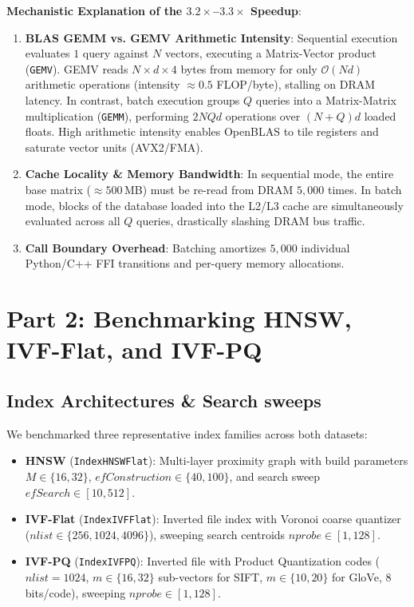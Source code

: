 \documentclass[10pt,twocolumn,a4paper]{article}
\begin{document}
\noindent\textbf{Mechanistic Explanation of the $3.2\times$--$3.3\times$ Speedup}:
\begin{enumerate}
    \item \textbf{BLAS GEMM vs. GEMV Arithmetic Intensity}: Sequential execution evaluates $1$ query against $N$ vectors, executing a Matrix-Vector product (\texttt{GEMV}). GEMV reads $N \times d \times 4$ bytes from memory for only $\mathcal{O}(N d)$ arithmetic operations (intensity $\approx 0.5$ FLOP/byte), stalling on DRAM latency. In contrast, batch execution groups $Q$ queries into a Matrix-Matrix multiplication (\texttt{GEMM}), performing $2 N Q d$ operations over $(N + Q) d$ loaded floats. High arithmetic intensity enables OpenBLAS to tile registers and saturate vector units (AVX2/FMA).
    \item \textbf{Cache Locality \& Memory Bandwidth}: In sequential mode, the entire base matrix ($\approx 500$\,MB) must be re-read from DRAM $5,000$ times. In batch mode, blocks of the database loaded into the L2/L3 cache are simultaneously evaluated across all $Q$ queries, drastically slashing DRAM bus traffic.
    \item \textbf{Call Boundary Overhead}: Batching amortizes $5,000$ individual Python/C++ FFI transitions and per-query memory allocations.
\end{enumerate}

\section{Part 2: Benchmarking HNSW, IVF-Flat, and IVF-PQ}

\subsection{Index Architectures \& Search sweeps}
We benchmarked three representative index families across both datasets:
\begin{itemize}
    \item \textbf{HNSW} (\texttt{IndexHNSWFlat}): Multi-layer proximity graph with build parameters $M \in \{16, 32\}$, $efConstruction \in \{40, 100\}$, and search sweep $efSearch \in [10, 512]$.
    \item \textbf{IVF-Flat} (\texttt{IndexIVFFlat}): Inverted file index with Voronoi coarse quantizer ($nlist \in \{256, 1024, 4096\}$), sweeping search centroids $nprobe \in [1, 128]$.
    \item \textbf{IVF-PQ} (\texttt{IndexIVFPQ}): Inverted file with Product Quantization codes ($nlist=1024$, $m \in \{16, 32\}$ sub-vectors for SIFT, $m \in \{10, 20\}$ for GloVe, 8 bits/code), sweeping $nprobe \in [1, 128]$.
\end{itemize}
\end{document}
